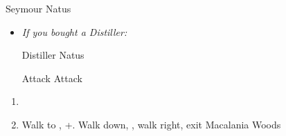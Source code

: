 \begin{battle}[36000]{Seymour Natus}
    \begin{itemize}
        \item \textit{If you bought a Distiller:}
        \begin{itemize}
            \tidusf Distiller Natus
        \end{itemize}
        \tidusf Attack
        \summon{\bahamut}
        \bahamutf Attack
    \end{itemize}
\end{battle}
\begin{enumerate}[resume]
    \item \sd
    \item Walk to \yuna, \cs+\skippablefmv[10:10]. Walk down, \cs[1:40], walk right, exit Macalania Woods
\end{enumerate}
